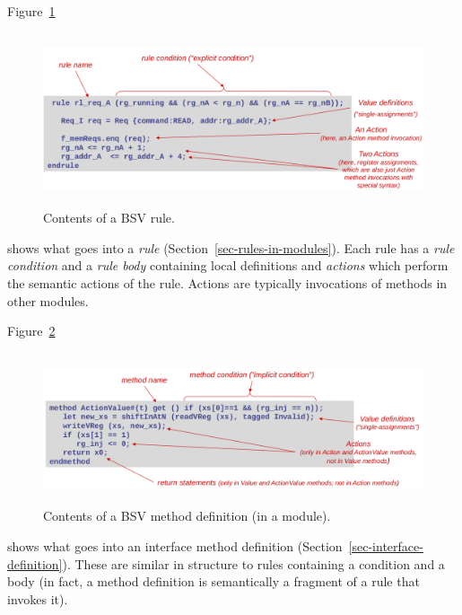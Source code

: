 \documentclass[twoside,letterpaper]{article}
\newcommand{\BSV}{BSV}
\begin{document}
Figure~\ref{fig_Contents_Rule}
\begin{figure}[htbp]
    \centerline{\includegraphics[height=2in]{Figures/fig_Contents_Rule}}
    \caption{%
        \label{fig_Contents_Rule}
        Contents of a {\BSV} rule.
    }
\end{figure}
shows what goes into a \emph{rule}
(Section~\ref{sec-rules-in-modules}).  Each rule has a \emph{rule
  condition} and a \emph{rule body} containing local definitions and
\emph{actions} which perform the semantic actions of the rule.
Actions are typically invocations of methods in other modules.

Figure~\ref{fig_Contents_Method_Def}
\begin{figure}[htbp]
    \centerline{\includegraphics[height=1.75in]{Figures/fig_Contents_Method_Def}}
    \caption{%
        \label{fig_Contents_Method_Def}
        Contents of a {\BSV} method definition (in a module).
    }
\end{figure}
shows what goes into an interface method definition
(Section~\ref{sec-interface-definition}).  These are similar in
structure to rules containing a condition and a body (in fact, a
method definition is semantically a fragment of a rule that invokes
it).
\end{document}
